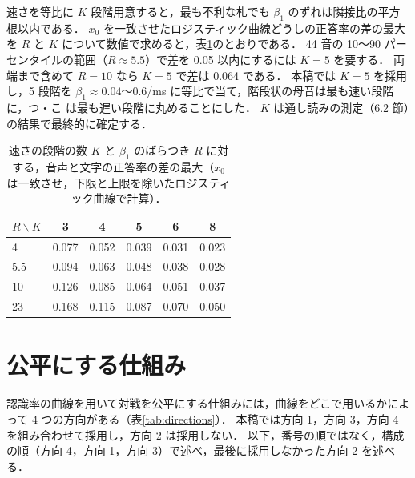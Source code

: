 速さを等比に $K$ 段階用意すると，最も不利な札でも $\beta_1$ のずれは隣接比の平方根以内である．
$x_0$ を一致させたロジスティック曲線どうしの正答率の差の最大を $R$ と $K$ について数値で求めると，表\ref{tab:RK}のとおりである．
44 音の 10〜90 パーセンタイルの範囲（$R \approx 5.5$）で差を 0.05 以内にするには $K = 5$ を要する．
両端まで含めて $R = 10$ なら $K = 5$ で差は 0.064 である．
本稿では $K = 5$ を採用し，5 段階を $\beta_1 \approx 0.04$〜$0.6$/ms に等比で当て，階段状の母音は最も速い段階に，つ・こ は最も遅い段階に丸めることにした．
$K$ は通し読みの測定（6.2 節）の結果で最終的に確定する．

\begin{table}[tb]
\caption{速さの段階の数 $K$ と $\beta_1$ のばらつき $R$ に対する，音声と文字の正答率の差の最大（$x_0$ は一致させ，下限と上限を除いたロジスティック曲線で計算）．}
\label{tab:RK}
\centering
\small
\begin{tabular}{lccccc}
\hline\hline
$R \backslash K$ & 3 & 4 & 5 & 6 & 8 \\
\hline
4 & 0.077 & 0.052 & 0.039 & 0.031 & 0.023 \\
5.5 & 0.094 & 0.063 & 0.048 & 0.038 & 0.028 \\
10 & 0.126 & 0.085 & 0.064 & 0.051 & 0.037 \\
23 & 0.168 & 0.115 & 0.087 & 0.070 & 0.050 \\
\hline
\end{tabular}
\end{table}

\section{公平にする仕組み}

認識率の曲線を用いて対戦を公平にする仕組みには，曲線をどこで用いるかによって 4 つの方向がある（表\ref{tab:directions}）．
本稿では方向 1，方向 3，方向 4 を組み合わせて採用し，方向 2 は採用しない．
以下，番号の順ではなく，構成の順（方向 4，方向 1，方向 3）で述べ，最後に採用しなかった方向 2 を述べる．

